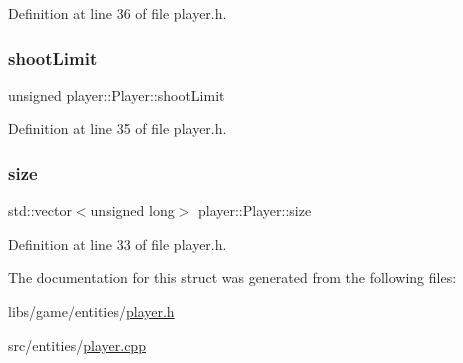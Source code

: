 Definition at line 36 of file player.\+h.

\mbox{\label{structplayer_1_1_player_ae7306efe3b72df4b8ccce8f1612a4729}} 
\subsubsection{\texorpdfstring{shoot\+Limit}{shootLimit}}
{\footnotesize\ttfamily unsigned player\+::\+Player\+::shoot\+Limit}



Definition at line 35 of file player.\+h.

\mbox{\label{structplayer_1_1_player_af4901794c6c932a6550973a88a446bac}} 
\subsubsection{\texorpdfstring{size}{size}}
{\footnotesize\ttfamily std\+::vector$<$unsigned long$>$ player\+::\+Player\+::size}



Definition at line 33 of file player.\+h.



The documentation for this struct was generated from the following files\+:\begin{DoxyCompactItemize}
\item 
libs/game/entities/\hyperlink{player_8h}{player.\+h}\item 
src/entities/\hyperlink{player_8cpp}{player.\+cpp}\end{DoxyCompactItemize}
